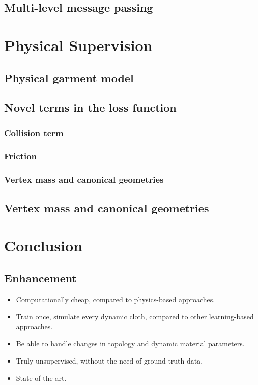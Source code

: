 \documentclass{article}
\begin{document}
\subsection{Multi-level message passing}

\section{Physical Supervision}
\subsection{Physical garment model}
\subsection{Novel terms in the loss function}
\subsubsection{Collision term}
\subsubsection{Friction}
\subsubsection{Vertex mass and canonical geometries}
\subsection{Vertex mass and canonical geometries}
\section{Conclusion}
\subsection{Enhancement}
\begin{itemize}
    \item Computationally cheap, compared to physics-based approaches.
    \item Train once, simulate every dynamic cloth, compared to other learning-based approaches.
    \item Be able to handle changes in topology and dynamic material parameters.
    \item Truly unsupervised, without the need of ground-truth data.
    \item State-of-the-art.
\end{itemize}
\end{document}
